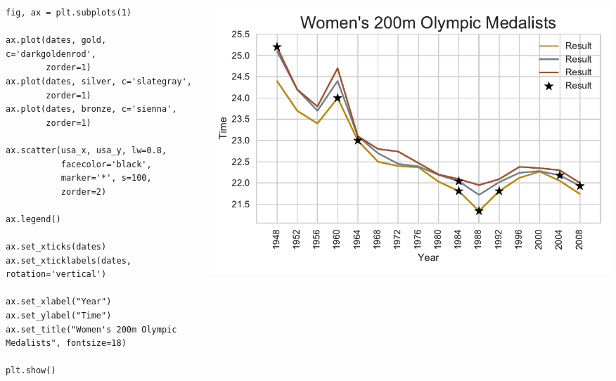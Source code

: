 \documentclass{beamer}
\begin{document}
\begin{frame}[fragile]
\tiny{
\begin{columns}
\begin{column}{0.45\textwidth}
\begin{verbatim}
fig, ax = plt.subplots(1)

ax.plot(dates, gold, c='darkgoldenrod',
        zorder=1)
ax.plot(dates, silver, c='slategray',
        zorder=1)
ax.plot(dates, bronze, c='sienna',
        zorder=1)

ax.scatter(usa_x, usa_y, lw=0.8,
           facecolor='black',
           marker='*', s=100,
           zorder=2)

ax.legend()

ax.set_xticks(dates)
ax.set_xticklabels(dates, rotation='vertical')

ax.set_xlabel("Year")
ax.set_ylabel("Time")
ax.set_title("Women's 200m Olympic Medalists", fontsize=18)

plt.show()
\end{verbatim}
\end{column}
\begin{column}{0.55\textwidth}
\includegraphics[width=\textwidth]{../olympics_7.pdf}
\end{column}
\end{columns}
}
\end{frame}
\end{document}
